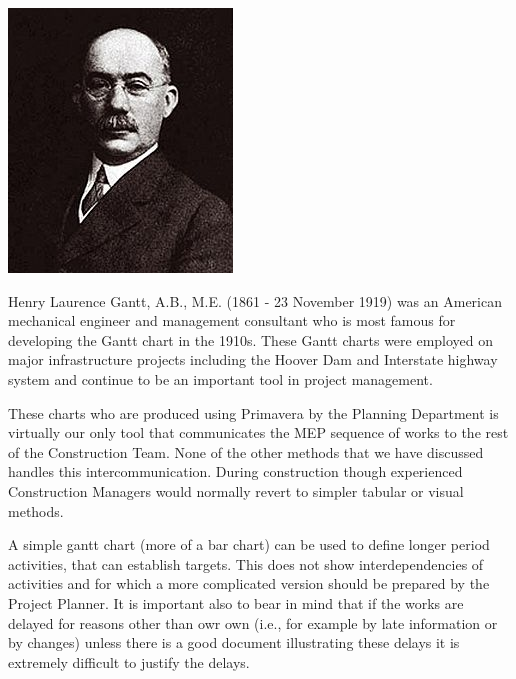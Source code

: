 \begin{marginfigure}
\includegraphics[width=\textwidth]{./graphics/henry-gantt}
\caption{Henry Laurence Gantt, A.B., M.E. (1861 - 23 November 1919) was an American mechanical engineer and management consultant who is most famous for developing the Gantt chart in the 1910s.
These Gantt charts were employed on major infrastructure projects including the Hoover Dam and Interstate highway system and continue to be an important tool in project management.}
\end{marginfigure}


These charts who are produced using Primavera by the Planning Department is
virtually our only tool that communicates the MEP sequence of works to the
rest of the Construction Team. None of the other methods that we have 
discussed handles this intercommunication. During construction though
experienced Construction Managers would normally revert to simpler tabular
or visual methods.

A simple gantt chart (more of a bar chart) can be used to define longer period
activities, that can establish targets. This does not show interdependencies
of activities and for which a more complicated version should be prepared by
the Project Planner. It is important also to bear in mind that if the works 
are delayed for reasons other than owr own (i.e., for example by late information
or by changes) unless there is a good document illustrating these delays it is
extremely difficult to justify the delays.

